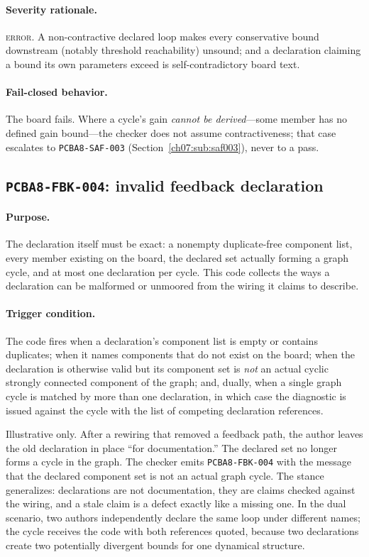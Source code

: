 \paragraph{Severity rationale.} \textsc{error}. A non-contractive declared loop makes every conservative bound downstream (notably threshold reachability) unsound; and a declaration claiming a bound its own parameters exceed is self-contradictory board text.

\paragraph{Fail-closed behavior.} The board fails. Where a cycle's gain \emph{cannot be derived}---some member has no defined gain bound---the checker does not assume contractiveness; that case escalates to \texttt{PCBA8-SAF-003} (Section~\ref{ch07:sub:saf003}), never to a pass.

\subsection{\texttt{PCBA8-FBK-004}: invalid feedback declaration}\label{ch07:sub:fbk004}

\paragraph{Purpose.} The declaration itself must be exact: a nonempty duplicate-free component list, every member existing on the board, the declared set actually forming a graph cycle, and at most one declaration per cycle. This code collects the ways a declaration can be malformed or unmoored from the wiring it claims to describe.

\paragraph{Trigger condition.} The code fires when a declaration's component list is empty or contains duplicates; when it names components that do not exist on the board; when the declaration is otherwise valid but its component set is \emph{not} an actual cyclic strongly connected component of the graph; and, dually, when a single graph cycle is matched by more than one declaration, in which case the diagnostic is issued against the cycle with the list of competing declaration references.

\begin{example}\label{ch07:ex:fbk004}
Illustrative only. After a rewiring that removed a feedback path, the author leaves the old declaration in place ``for documentation.'' The declared set no longer forms a cycle in the graph. The checker emits \texttt{PCBA8-FBK-004} with the message that the declared component set is not an actual graph cycle. The stance generalizes: declarations are not documentation, they are claims checked against the wiring, and a stale claim is a defect exactly like a missing one. In the dual scenario, two authors independently declare the same loop under different names; the cycle receives the code with both references quoted, because two declarations create two potentially divergent bounds for one dynamical structure.
\end{example}

